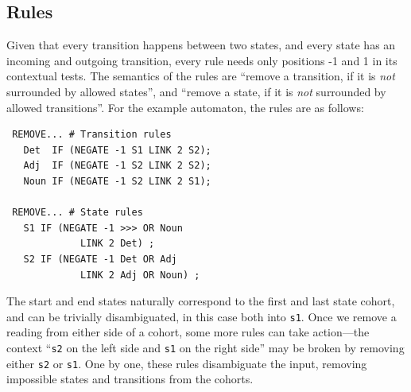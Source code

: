 \documentclass[11pt]{article}
\def\t#1{\texttt{#1}}
\begin{document}
\subsection{Rules}
Given that every transition happens between two states, and every state 
has an incoming and outgoing transition, every rule needs only
positions -1 and 1 in its contextual tests. 
The semantics of the rules are ``remove a transition, if it is 
\emph{not} surrounded by allowed states'',
and ``remove a state, if it is \emph{not} surrounded by allowed transitions''.
For the example automaton, the rules are as follows:

\begin{verbatim}
 REMOVE... # Transition rules
   Det  IF (NEGATE -1 S1 LINK 2 S2);
   Adj  IF (NEGATE -1 S2 LINK 2 S2);
   Noun IF (NEGATE -1 S2 LINK 2 S1);

 REMOVE... # State rules
   S1 IF (NEGATE -1 >>> OR Noun
             LINK 2 Det) ;
   S2 IF (NEGATE -1 Det OR Adj 
             LINK 2 Adj OR Noun) ;
\end{verbatim}

The start and end states naturally correspond to the first and last
state cohort, and can be trivially disambiguated, in this case both into \t{s1}.
Once we remove a reading from either side of a cohort, some more rules can take
action---the context ``\t{s2} on the left side and \t{s1} on the right side''
may be broken by removing either \t{s2} or \t{s1}. 
One by one, these rules disambiguate the input, removing impossible
states and transitions from the cohorts.




\end{document}

